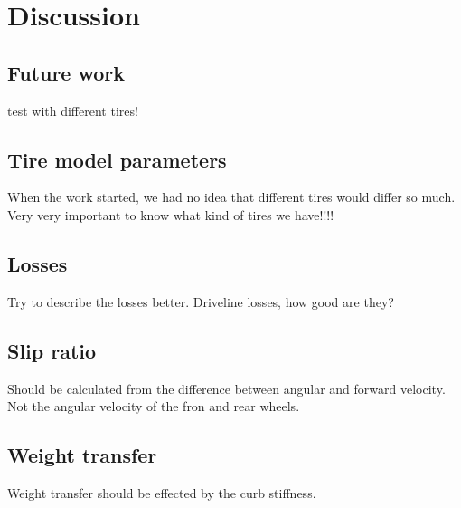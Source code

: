 \chapter{Discussion}

\section{Future work}

test with different tires!

\section{Tire model parameters}
When the work started, we had no idea that different tires would differ so much. Very very important to know what kind of tires we have!!!!

\section{Losses}
Try to describe the losses better. Driveline losses, how good are they?

\section{Slip ratio}
Should be calculated from the difference between angular and forward velocity. Not the angular velocity of the fron and rear wheels. 


\section{Weight transfer}
Weight transfer should be effected by the curb stiffness. 